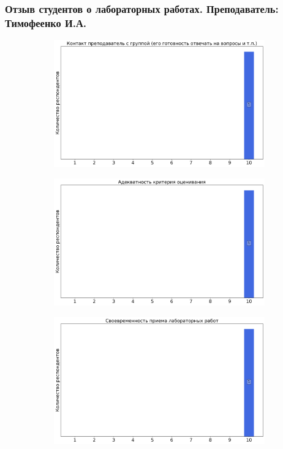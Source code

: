     \subsubsection{Отзыв студентов о лабораторных работах. Преподаватель: Тимофеенко И.А.}
		\begin{figure}[H]
			\centering
			\begin{subfigure}[b]{0.45\textwidth}
				\centering
				\includegraphics[width=\textwidth]{images/3 course/Радиофизическая лаборатория/labniks-marks-Тимофеенко-0.png}
			\end{subfigure}
			\begin{subfigure}[b]{0.45\textwidth}
				\centering
				\includegraphics[width=\textwidth]{images/3 course/Радиофизическая лаборатория/labniks-marks-Тимофеенко-1.png}
			\end{subfigure}
			\begin{subfigure}[b]{0.45\textwidth}
				\centering
				\includegraphics[width=\textwidth]{images/3 course/Радиофизическая лаборатория/labniks-marks-Тимофеенко-2.png}

\end{subfigure}
\end{figure}
